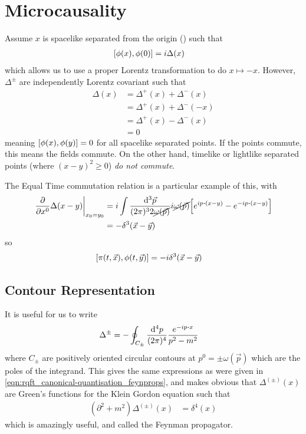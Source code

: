 \documentclass[notes.tex]{subfiles}
\begin{document}
\section{Microcausality}
Assume $x$ is spacelike separated from the origin () such that
\begin{align*}
    \commutator{\phi(x)}{\phi(0)} &= i\Delta(x)
\end{align*}
which allows us to use a proper Lorentz transformation to do $x\mapsto-x$.
However, $\Delta^\pm$ are independently Lorentz covariant such that
\begin{align*}
    \Delta(x) &= \Delta^+(x) + \Delta^-(x)\\
    &= \Delta^+(x) + \Delta^-(-x)\\
    &= \Delta^+(x) - \Delta^-(x)\\
    &= 0
\end{align*}
meaning $\commutator{\phi(x)}{\phi(y)} = 0$ for all spacelike separated points.
If the points commute, this means the fields commute. On the other hand, timelike or lightlike separated points (where $(x-y)^2 \geq 0$) \emph{do not commute}.

The Equal Time commutation relation is a particular example of this, with
\begin{align*}
    \eval{\pdv{x^0}\Delta(x-y)}_{x_0 = y_0} &= i\int \frac{\dd[3]{\vec{p}}}{(2\pi)^3 2 \cancel{\omega(\vec{p})}} i \cancel{\omega(\vec{p})} \qty[e^{ip\vdot(x-y)} - e^{-ip\vdot(x-y)}]\\
    &= -\delta^3(\vec{x} - \vec{y})
\end{align*}
so\begin{align*}
    \commutator{\pi(t, \vec{x})}{\phi(t, \vec{y})} &= -i\delta^3(\vec{x} - \vec{y})
\end{align*}

\subsection{Contour Representation}
It is useful for us to write 
\begin{align*}
    \Delta^\pm &= - \oint_{C_\pm} \frac{\dd[4]{p}}{(2\pi)^4}\frac{e^{-ip\vdot{}x}}{p^2 - m^2}
\end{align*}
where $C_\pm$ are positively oriented circular contours at $p^0=\pm \omega(\vec{p})$ which are the poles of the integrand. This gives the same expressions as were given in \autoref{eqn:rqft_canonical-quantisation_feynprops}, and makes obvious that $\Delta^{(\pm)}(x)$ are Green's functions for the Klein Gordon equation such that
\begin{align*}
    (\partial^2 + m^2)\Delta^{(\pm)}(x) &= \delta^4(x)
\end{align*}
which is amazingly useful, and called the Feynman propagator.
\end{document}
